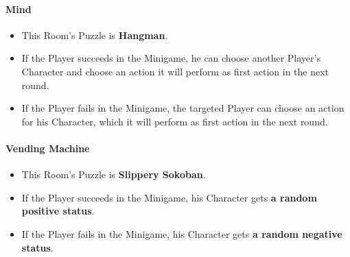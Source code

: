 \paragraph{Mind}
\begin{itemize}
	\item This Room's Puzzle is \textbf{Hangman}.
	\item If the Player succeeds in the Minigame, he can choose another Player's Character and choose an action it will perform as first action in the next round.
	\item If the Player fails    in the Minigame, the targeted Player can choose an action for his Character, which it will perform as first action in the next round.
\end{itemize}

\paragraph{Vending Machine} 
\begin{itemize}
	\item This Room's Puzzle is \textbf{Slippery Sokoban}.
	\item If the Player succeeds in the Minigame, his Character gets \textbf{a random positive status}.
	\item If the Player fails    in the Minigame, his Character gets \textbf{a random negative status}.
\end{itemize}


